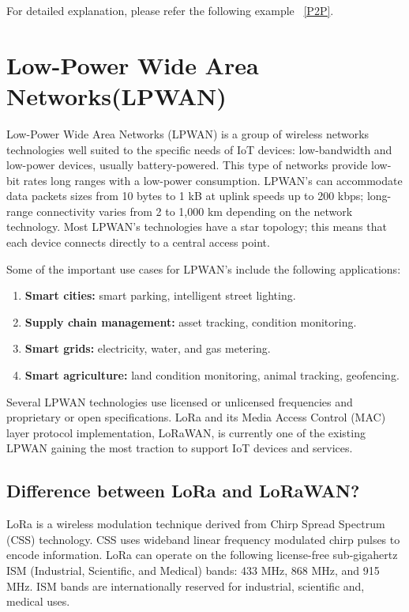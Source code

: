 For detailed explanation, please refer the following example ~\ref{P2P}.



\section{Low-Power Wide Area Networks(LPWAN)} 

Low-Power Wide Area Networks (LPWAN) is a group of wireless networks technologies well suited to the specific needs of IoT devices: low-bandwidth and low-power devices, usually battery-powered. This type of networks provide low-bit rates long ranges with a low-power consumption. LPWAN's can accommodate data packets sizes from 10 bytes to 1 kB at uplink speeds up to 200 kbps; long-range connectivity varies from 2 to 1,000 km depending on the network technology. Most LPWAN's technologies have a star topology; this means that each device connects directly to a central access point. \cite{ArduinoLoRaWAN101:2024}

Some of the important use cases for LPWAN's include the following applications:

\begin{enumerate}
	\item \textbf{Smart cities:} smart parking, intelligent street lighting.
	\item \textbf{Supply chain management:} asset tracking, condition monitoring.
	\item \textbf{Smart grids:} electricity, water, and gas metering.
	\item \textbf{Smart agriculture:} land condition monitoring, animal tracking, geofencing. \cite{ArduinoLoRaWAN101:2024}
\end{enumerate}

Several LPWAN technologies use licensed or unlicensed frequencies and proprietary or open specifications. LoRa and its Media Access Control (MAC) layer protocol implementation, LoRaWAN, is currently one of the existing LPWAN gaining the most traction to support IoT devices and services. 


\subsection{Difference between LoRa and LoRaWAN?} 
LoRa is a wireless modulation technique derived from Chirp Spread Spectrum (CSS) technology. CSS uses wideband linear frequency modulated chirp pulses to encode information. LoRa can operate on the following license-free sub-gigahertz ISM (Industrial, Scientific, and Medical) bands: 433 MHz, 868 MHz, and 915 MHz. ISM bands are internationally reserved for industrial, scientific and, medical uses. 
\newline

